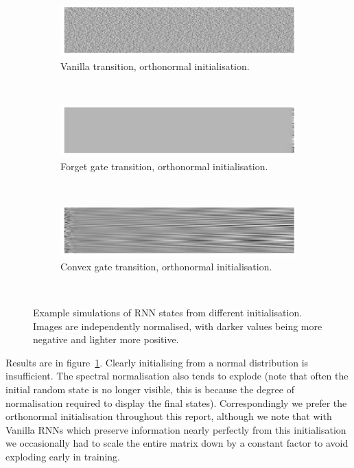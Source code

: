 \begin{figure}
\begin{subfigure}[t]{0.3\textwidth}
\includegraphics[width=\textwidth]{appendix/init/vanillaorth}
\caption{Vanilla transition, orthonormal initialisation.}
\end{subfigure}~
\begin{subfigure}[t]{0.3\textwidth}
\includegraphics[width=\textwidth]{appendix/init/lstmorth}
\caption{Forget gate transition, orthonormal initialisation.}
\end{subfigure}~
\begin{subfigure}[t]{0.3\textwidth}
\includegraphics[width=\textwidth]{appendix/init/gruspec}
\caption{Convex gate transition, orthonormal initialisation.}
\end{subfigure}\\

\caption{Example simulations of RNN states from different initialisation. Images are
independently normalised, with darker values being more negative and lighter more positive.}
\label{fig:inits}
\end{figure}

Results are in figure~\ref{fig:inits}. Clearly initialising from a normal distribution is
insufficient. The spectral normalisation also tends to explode (note that often the initial
random state is no longer visible, this is because the degree of normalisation required
to display the final states). Correspondingly we prefer the orthonormal initialisation
throughout this report, although we note that with Vanilla RNNs which preserve information
nearly perfectly from this initialisation we occasionally had to scale the entire matrix down
by a constant factor to avoid exploding early in training.


